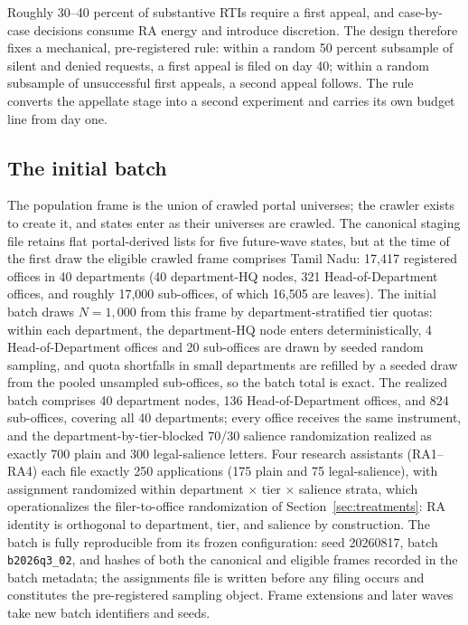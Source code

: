 \documentclass[11pt]{article}
\begin{document}
Roughly 30--40 percent of substantive RTIs require a first appeal, and case-by-case decisions consume RA energy and introduce discretion. The design therefore fixes a mechanical, pre-registered rule: within a random 50 percent subsample of silent and denied requests, a first appeal is filed on day 40; within a random subsample of unsuccessful first appeals, a second appeal follows. The rule converts the appellate stage into a second experiment and carries its own budget line from day one.

\subsection{The initial batch}
\label{sec:wave1}

The population frame is the union of crawled portal universes; the crawler exists to create it, and states enter as their universes are crawled. The canonical staging file retains flat portal-derived lists for five future-wave states, but at the time of the first draw the eligible crawled frame comprises Tamil Nadu: 17,417 registered offices in 40 departments (40 department-HQ nodes, 321 Head-of-Department offices, and roughly 17,000 sub-offices, of which 16,505 are leaves). The initial batch draws $N=1{,}000$ from this frame by department-stratified tier quotas: within each department, the department-HQ node enters deterministically, 4 Head-of-Department offices and 20 sub-offices are drawn by seeded random sampling, and quota shortfalls in small departments are refilled by a seeded draw from the pooled unsampled sub-offices, so the batch total is exact. The realized batch comprises 40 department nodes, 136 Head-of-Department offices, and 824 sub-offices, covering all 40 departments; every office receives the same instrument, and the department-by-tier-blocked 70/30 salience randomization realized as exactly 700 plain and 300 legal-salience letters. Four research assistants (RA1--RA4) each file exactly 250 applications (175 plain and 75 legal-salience), with assignment randomized within department $\times$ tier $\times$ salience strata, which operationalizes the filer-to-office randomization of Section~\ref{sec:treatments}: RA identity is orthogonal to department, tier, and salience by construction. The batch is fully reproducible from its frozen configuration: seed 20260817, batch \texttt{b2026q3\_02}, and hashes of both the canonical and eligible frames recorded in the batch metadata; the assignments file is written before any filing occurs and constitutes the pre-registered sampling object. Frame extensions and later waves take new batch identifiers and seeds.
\end{document}
